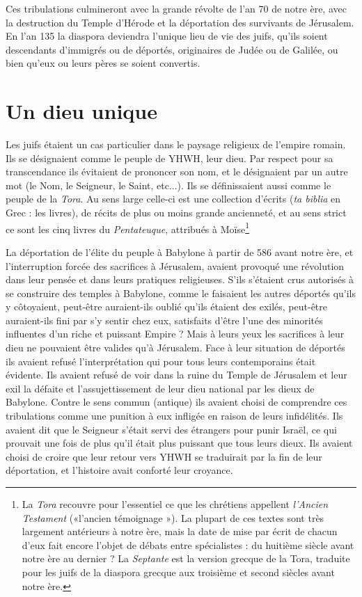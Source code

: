  Ces tribulations culmineront avec la grande révolte de l'an 70 de notre ère, avec la destruction du Temple d'Hérode et la déportation des survivants de Jérusalem. En l'an 135 la diaspora deviendra l'unique lieu de vie des juifs, qu'ils soient descendants d'immigrés ou de déportés, originaires de Judée ou de Galilée, ou bien qu'eux ou leurs pères se soient convertis. 


\section{Un dieu unique}

 Les juifs étaient un cas particulier dans le paysage religieux de l'empire romain. Ils se désignaient comme le peuple de YHWH, leur dieu. Par respect pour sa transcendance ils évitaient de prononcer son nom, et le désignaient par un autre mot (le Nom, le Seigneur, le Saint, etc...). Ils se définissaient aussi comme le peuple de la \emph{Tora}. Au sens large celle-ci est une collection d'écrits (\emph{ta biblia} en Grec : les livres), de récits de plus ou moins grande ancienneté, et au sens strict ce sont les cinq livres du \emph{Pentateuque}, attribués à Moïse\footnote{La \emph{Tora} recouvre pour l'essentiel ce que les chrétiens appellent \emph{l'Ancien Testament} («l'ancien témoignage »). La plupart de ces textes sont très largement antérieurs à notre ère, mais la date de mise par écrit de chacun d'eux fait encore l'objet de débats entre spécialistes : du huitième siècle avant notre ère au dernier ? La \emph{Septante} est la version grecque de la Tora, traduite pour les juifs de la diaspora grecque aux troisième et second siècles avant notre ère.}%
 
 
 
 La déportation de l'élite du peuple à Babylone à partir de 586 avant notre ère, et l'interruption forcée des sacrifices à Jérusalem, avaient provoqué une révolution dans leur pensée et dans leurs pratiques religieuses. S'ils s'étaient crus autorisés à se construire des temples à Babylone, comme le faisaient les autres déportés qu'ils y côtoyaient, peut-être auraient-ils oublié qu'ils étaient des exilés, peut-être auraient-ils fini par s'y sentir chez eux, satisfaits d'être l'une des minorités influentes d'un riche et puissant Empire ? Mais à leurs yeux les sacrifices à leur dieu ne pouvaient être valides qu'à Jérusalem. Face à leur situation de déportés ils avaient refusé l'interprétation qui pour tous leurs contemporains était évidente. Ils avaient refusé de voir dans la ruine du Temple de Jérusalem et leur exil la défaite et l'assujettissement de leur dieu national par les dieux de Babylone. Contre le sens commun (antique) ils avaient choisi de comprendre ces tribulations comme une punition à eux infligée en raison de leurs infidélités. Ils avaient dit que le Seigneur s'était servi des étrangers pour punir Israël, ce qui prouvait une fois de plus qu'il était plus puissant que tous leurs dieux. Ils avaient choisi de croire que leur retour vers YHWH se traduirait par la fin de leur déportation, et l'histoire avait conforté leur croyance. 
 
